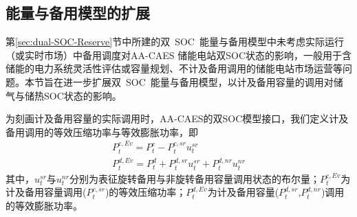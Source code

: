 \subsection{能量与备用模型的扩展}
\label{sec:dual-SOC-Reserve-exten}
第\ref{sec:dual-SOC-Reserve}节中所建的双~SOC~能量与备用模型中未考虑实际运行（或实时市场）中备用调度对AA-CAES 储能电站双SOC状态的影响，一般用于含储能的电力系统灵活性评估或容量规划、不计及备用调用的储能电站市场运营等问题。本节旨在进一步扩展双~SOC~能量与备用模型，以计及备用容量的调用对储气与储热SOC状态的影响。

为刻画计及备用容量的实际调用时，AA-CAES的双SOC模型接口，我们定义计及备用调用的等效压缩功率与等效膨胀功率，即
\begin{subequations}
\label{equ:def-power-relation}
\begin{gather}
P_t^{c,Ev} = P_t^c - P_t^{c,sr}u_t^{sr}\\
P_t^{d,Ev} = P_t^d + P_t^{d,sr}u_t^{sr} + P_t^{d,nr}u_t^{nr}
\end{gather}
\end{subequations}
其中，$u_t^{sr}$与$u_t^{nr}$分别为表征旋转备用与非旋转备用容量调用状态的布尔量；$P_t^{c,Ev}$为计及备用容量调用($P_t^{c,sr}$)的等效压缩功率；$P_t^{d,Ev}$为计及备用容量($P_t^{d,sr}$,$P_t^{d,nr}$)调用的等效膨胀功率。


